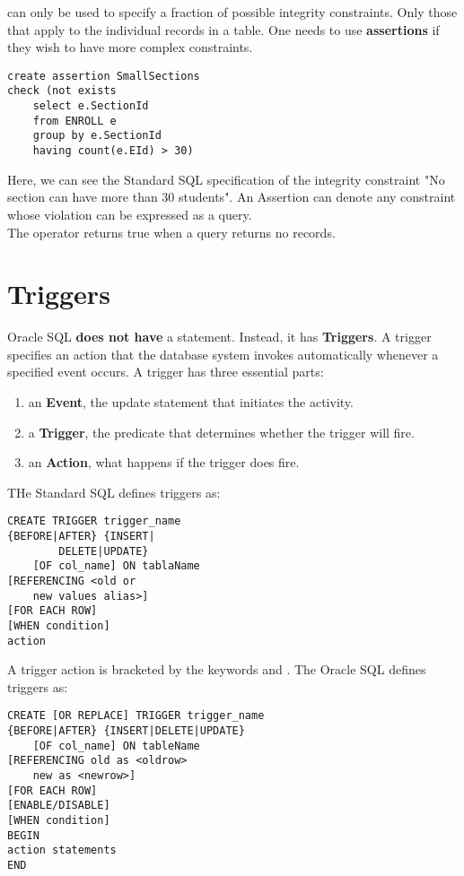 \documentclass[11pt,a4paper,twocolumn]{book}
\begin{document}
 can only be used to specify a fraction of possible integrity constraints. Only those that apply to the individual records in a table. One needs to use \textbf{assertions} if they wish to have more complex constraints.

\begin{lstlisting}
create assertion SmallSections
check (not exists
	select e.SectionId
	from ENROLL e
	group by e.SectionId
	having count(e.EId) > 30)
\end{lstlisting}

Here, we can see the Standard SQL specification of the integrity constraint "No section can have more than 30 students". An Assertion can denote any constraint whose violation can be expressed as a query.\\

The  operator returns true when a query returns no records.\\

\section{Triggers}

Oracle SQL \textbf{does not have} a  statement. Instead, it has \textbf{Triggers}. A trigger specifies an action that the database system invokes automatically whenever a specified event occurs. A trigger has three essential parts:

\begin{enumerate}
\item an \textbf{Event}, the update statement that initiates the activity.
\item a \textbf{Trigger}, the predicate that determines whether the trigger will fire.
\item an \textbf{Action}, what happens if the trigger does fire.
\end{enumerate}


THe Standard SQL defines triggers as:

\begin{lstlisting}
CREATE TRIGGER trigger_name
{BEFORE|AFTER} {INSERT|
		DELETE|UPDATE}
	[OF col_name] ON tablaName
[REFERENCING <old or 
	new values alias>]
[FOR EACH ROW]
[WHEN condition]
action
\end{lstlisting}

A trigger action is bracketed by the keywords  and . The Oracle SQL defines triggers as:

\begin{lstlisting}
CREATE [OR REPLACE] TRIGGER trigger_name
{BEFORE|AFTER} {INSERT|DELETE|UPDATE}
	[OF col_name] ON tableName
[REFERENCING old as <oldrow>
	new as <newrow>]
[FOR EACH ROW]
[ENABLE/DISABLE]
[WHEN condition]
BEGIN
action statements
END
\end{lstlisting}
\end{document}
